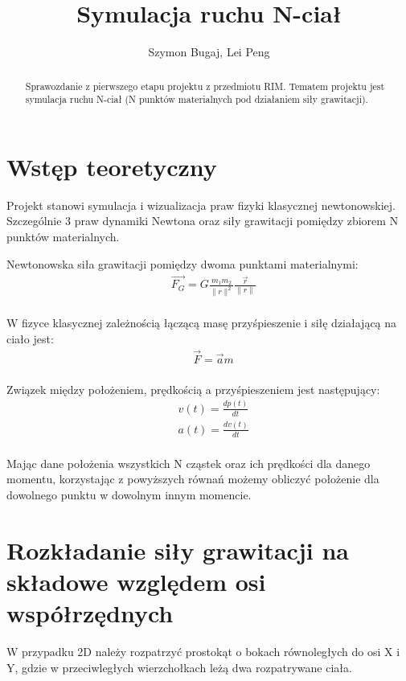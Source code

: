 \documentclass[fleqn]{article}
\begin{document}
\title{Symulacja ruchu N-ciał}
\author{Szymon Bugaj, Lei Peng}

\maketitle

\begin{abstract}
Sprawozdanie z pierwszego etapu projektu z przedmiotu RIM.
Tematem projektu jest symulacja ruchu N-ciał 
(N punktów materialnych pod działaniem siły grawitacji).
\end{abstract}

\tableofcontents



\section{Wstęp teoretyczny}
Projekt stanowi symulacja i wizualizacja praw fizyki klasycznej newtonowskiej. Szczególnie 3 praw dynamiki Newtona oraz siły grawitacji pomiędzy zbiorem N punktów materialnych.

Newtonowska siła grawitacji pomiędzy dwoma punktami materialnymi:
\begin{align*}
    &\vec{F_{G}} = G\frac{m_{1} m_{2}}{\|r\|^{2}}\frac{\vec{r}}{\|r\|} \\
\end{align*}

W fizyce klasycznej zależnością łączącą masę przyśpieszenie i siłę działającą na ciało jest:
\begin{align*}
    &\vec{F} = \vec{a}m \\
\end{align*}

Związek między położeniem, prędkością a przyśpieszeniem jest następujący:
\begin{align*}
    &v(t) = \frac{dp(t)}{dt} \\
    &a(t) = \frac{dv(t)}{dt} \\
\end{align*}

Mając dane położenia wszystkich N cząstek oraz ich prędkości dla danego momentu,
korzystając z powyższych równań możemy obliczyć położenie dla dowolnego punktu w dowolnym innym momencie.

\section{Rozkładanie siły grawitacji na składowe względem osi współrzędnych}
W przypadku 2D należy rozpatrzyć prostokąt o bokach równoległych do osi X i Y, gdzie w przeciwległych
wierzchołkach leżą dwa rozpatrywane ciała.
\end{document}
